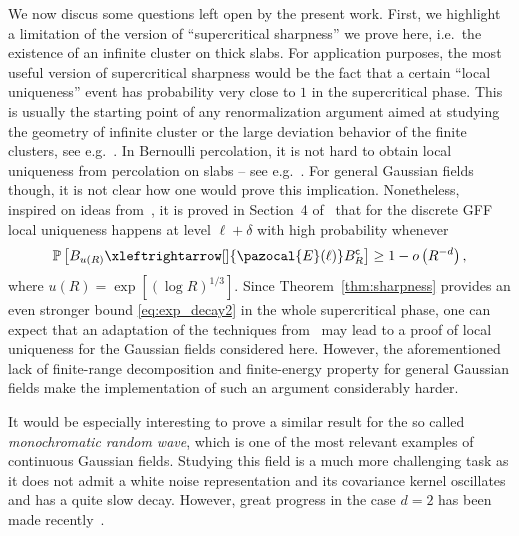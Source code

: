 \documentclass[10pt]{amsart}
\theoremstyle{definition}\newtheorem{defi}[theo]{Definition}\newtheorem{rema}[theo]{Remark}\newtheorem{exam}[theo]{Example}\newtheorem{exem}[theo]{Example}\newtheorem{nota}[theo]{Notation}
\renewcommand{\P}{\mathbb{P}}
\newcommand{\sfc}{\mathsf{c}}
\newcommand{\lr}[4]{#3\xleftrightarrow[#1]{#2} #4}
\begin{document}
We now discus some questions left open by the present work. First, we highlight a limitation of the version of ``supercritical sharpness'' we prove here, i.e.~the existence of an infinite cluster on thick slabs. For application purposes, the most useful version of supercritical sharpness would be the fact that a certain ``local uniqueness'' event has probability very close to $1$ in the supercritical phase. This is usually the starting point of any renormalization argument aimed at studying the geometry of infinite cluster or the large deviation behavior of the finite clusters, see e.g.~\cite{Cer00,Bar04,MR3650417}. In Bernoulli percolation, it is not hard to obtain local uniqueness from percolation on slabs -- see e.g.~\cite{Gri99a}. For general Gaussian fields though, it is not clear how one would prove this implication. Nonetheless, inspired on ideas from~\cite{benjaminitassion17}, it is proved in Section~4 of~\cite{DGRS19} that for the discrete GFF local uniqueness happens at level $\ell+\delta$ with high probability whenever 
\[
\P\left[\lr{}{\pazocal{E}(\ell)}{B_{u(R)}}{B_R^{\sfc}}\right]\geq 1-o\left(R^{-d}\right),
\]
where $u(R)=\exp[(\log R)^{1/3}]$. Since Theorem~\ref{thm:sharpness} provides an even stronger bound \eqref{eq:exp_decay2} in the whole supercritical phase, one can expect that an adaptation of the techniques from~\cite{DGRS19} may lead to a proof of local uniqueness for the Gaussian fields considered here. However, the aforementioned lack of finite-range decomposition and finite-energy property for general Gaussian fields make the implementation of such an argument considerably harder.

It would be especially interesting to prove a similar result for the so called \emph{monochromatic random wave}, which is one of the most relevant examples of continuous Gaussian fields. Studying this field is a much more challenging task as it does not admit a white noise representation and its covariance kernel oscillates and has a quite slow decay. However, great progress in the case $d=2$ has been made recently~\cite{MRV20}.
\end{document}
